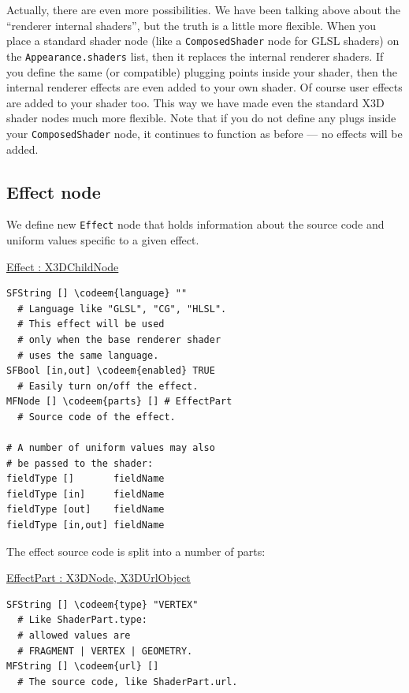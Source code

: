 \documentclass{egpubl}
\newenvironment{mycode}
{\begin{mycodecore}}
{\end{mycodecore}
\vspace{-0.1in}}
\newcommand*{\codeem}[1]{\textbf{#1}}
\begin{document}
Actually, there are even more possibilities.
We have been talking above about the ``renderer internal shaders'',
but the truth is a little more flexible.
When you place a standard shader node
(like a \texttt{ComposedShader} node for GLSL shaders) on the
\texttt{Appearance.shaders} list,
then it replaces the internal renderer shaders.
If you define the same (or compatible) plugging points inside your shader,
then the internal renderer effects are even added to your own
shader. Of course user effects are added to your shader too.
This way we have made even the standard X3D shader nodes much more flexible.
Note that if you do not define any plugs inside your \texttt{ComposedShader} node,
it continues to function as before --- no effects
will be added.

\subsection{Effect node}

We define new \texttt{Effect} node that holds information about
the source code and uniform values specific to a given effect.

\begin{mycode}
\underline{Effect : X3DChildNode}
\begin{Verbatim}[commandchars=\\\{\},fontsize=\small]
SFString [] \codeem{language} ""
  # Language like "GLSL", "CG", "HLSL".
  # This effect will be used
  # only when the base renderer shader
  # uses the same language.
SFBool [in,out] \codeem{enabled} TRUE
  # Easily turn on/off the effect.
MFNode [] \codeem{parts} [] # EffectPart
  # Source code of the effect.

# A number of uniform values may also
# be passed to the shader:
fieldType []       fieldName
fieldType [in]     fieldName
fieldType [out]    fieldName
fieldType [in,out] fieldName
\end{Verbatim}
\end{mycode}



\needspace{1in}
The effect source code is split into a number of parts:

\begin{mycode}
\underline{EffectPart : X3DNode, X3DUrlObject}
\begin{Verbatim}[commandchars=\\\{\},fontsize=\small]
SFString [] \codeem{type} "VERTEX"
  # Like ShaderPart.type:
  # allowed values are
  # FRAGMENT | VERTEX | GEOMETRY.
MFString [] \codeem{url} []
  # The source code, like ShaderPart.url.
\end{Verbatim}
\end{mycode}
\end{document}
